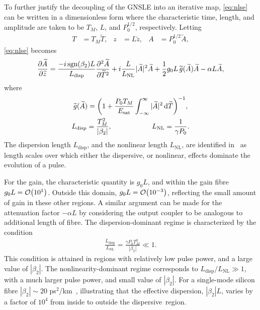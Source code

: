 \documentclass[9pt,twocolumn,twoside]{osajnl}
\let\originalleft\left
\let\originalright\right
\renewcommand{\left}{\mathopen{}\mathclose\bgroup\originalleft}
\renewcommand{\right}{\aftergroup\egroup\originalright}
\providecommand{\df}{\textrm{d}} %
\newcommand{\pdiff}[3][\hspace{-0.5pt}]{\frac{\partial^{#1}#2}{\partial{#3}^{#1}}} %
\newcommand{\Es}{E_{\textrm{sat}}} %
\providecommand{\bigO}[1]{\ensuremath{\mathop{}\mathopen{}\mathcal{O}\mathopen{}\left(#1\right)}} %
\begin{document}
To further justify the decoupling of the GNSLE into an iterative map, \eqref{eq:nlse} can be written in a dimensionless form where the characteristic time, length, and amplitude are taken to be $T_M$, $L$, and $P_0^{1/2}$, respectively. Letting
\begin{align}
	T &= T_M \widetilde{T}, & z &= L \widetilde{z}, & A &= P_0^{1/2} \widetilde{A},
\end{align}
\eqref{eq:nlse} becomes
\begin{align}
	\pdiff{\widetilde{A}}{\widetilde{z}} = \frac{-i \, \textrm{sgn}(\beta_2) L}{L_\textrm{disp}} \pdiff[2]{\widetilde{A}}{\widetilde{T}} + i \frac{L}{L_\textrm{NL}} |\widetilde{A}|^2 \widetilde{A} + \frac{1}{2}g_0 L \, \widetilde{g}(\widetilde{A}) \widetilde{A} - \alpha L \widetilde{A},
	\label{eq:ndgnlse}
\end{align}
where
\begin{equation}
	\begin{gathered}
		\widetilde{g}(\widetilde{A}) = \left( 1 + \frac{P_0 T_M}{\Es} \int_{-\infty}^\infty |\widetilde{A}|^2 \, \df \widetilde{T} \right)^{-1}, \\
		L_\textrm{disp} = \frac{T_M^2}{|\beta_2|}, \hspace{2cm} L_\textrm{NL} = \frac{1}{\gamma P_0}.
	\end{gathered}
\end{equation}
The dispersion length $L_\textrm{disp}$, and the nonlinear length $L_\textrm{NL}$, are identified in~\cite{agrawal2013} as length scales over which either the dispersive, or nonlinear, effects dominate the evolution of a pulse.

For the gain, the characteristic quantity is $g_0 L$, and within the gain fibre $g_0 L = \bigO{10^1}$. Outside this domain, $g_0 L = \bigO{10^{-3}}$, reflecting the small amount of gain in these other regions. A similar argument can be made for the attenuation factor $-\alpha L$ by considering the output coupler to be analogous to additional length of fibre. The dispersion-dominant regime is characterized by the condition~\cite{agrawal2013}
\begin{align}
	\frac{L_\textrm{disp}}{L_\textrm{NL}} = \frac{\gamma P_0 T_M^2}{|\beta_2|} \ll 1.
\end{align}
This condition is attained in regions with relatively low pulse power, and a large value of $|\beta_2|$. The nonlinearity-dominant regime corresponds to $L_\textrm{disp} / L_\textrm{NL} \gg 1$, with a much larger pulse power, and small value of $|\beta_2|$. For a single-mode silicon fibre $|\beta_2| \sim 20$ ps$^2$/km~\cite{agrawal2013}, illustrating that the effective dispersion, $|\beta_2| L$, varies by a factor of $10^4$ from inside to outside the dispersive~region.
\end{document}
